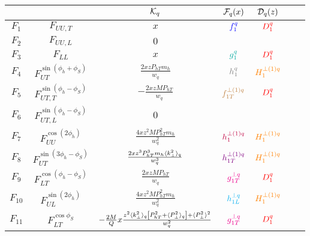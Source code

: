 \documentclass[floatfix,aps,prd,nofootinbib,superscriptaddress,preprint]{revtex4}
\newcommand\3[1]{\boldsymbol{#1}}
\newcommand{\Phperp}{P_{hT}}
\newcommand{\pperp}{P_\perp}
\newcommand{\avpperp}{\la \pperp^2 \ra}
\newcommand{\la}{\langle}
\newcommand{\ra}{\rangle}
\begin{document}
\begin{table}[h!]
\begin{tabular}{|c|c|c|c|c|c|c|}
\hline
         &                                     & ${\cal{K}}_q$                                                                               & ${\cal F}_q(x)$ & ${\cal D}_q(z)$ \\\hline
$F_1$    & $F_{UU,T}$                          & $x$                                                                                         & ${\color{blue} f_1^q}$          & ${\color{red} D_1^{q}} $          \\\hline
$F_2$    & $F_{UU,L}$                          & $0$                                                                                         &                 & \\\hline
$F_3$    & $F_{LL}$                            & $x$                                                                                         & $\ppdf$         & ${\color{red} D_1^{q}}$           \\\hline
$F_4$    & $F_{UT}^{\sin(\phi_h+\phi_S)}$      & $\frac{2 x z \Phperp  m_h}{w_q}$                                                            & $\transversity$ & ${\color{orange} H^{\perp(1)q}_{1} }$      \\\hline
$F_5$    & $F_{UT,T}^{\sin(\phi_h-\phi_S)}$    & $-\frac{2xzM \Phperp}{w_q}$                                                                 & ${\color{brown} f^{\perp(1)q}_{1T}}$       & ${\color{red} D_1^{q}}$           \\\hline
$F_6$    & $F_{UT,L}^{\sin(\phi_h-\phi_S)}$    & $0$                                                                                         &                 & \\\hline
$F_7$    & $F_{UU}^{\cos(2\phi_h)}$            & $\frac{4 x z^2 M \Phperp^2 m_h}{w_q^2} $                                                    & ${\color{purple} h^{\perp(1)q}_1 }$  & ${\color{orange} H^{\perp(1)q}_{1} } $     \\\hline
$F_8$    & $F_{UT}^{\sin(3\phi_h-\phi_S)}$     & $\frac{2 x z^3 \Phperp^3 m_h \avk}{w_q^3} $                                                 & ${\color{violet} h^{\perp(1)q}_{1T} }$ & ${\color{orange} H^{\perp(1)q}_{1} } $     \\\hline
$F_9$    & $F_{LT}^{\cos(\phi_h -\phi_S)}$     & $ \frac{2xzM\Phperp}{w_q} $                                                                 & ${\color{magenta} g^{\perp q}_{1T}}$          & ${\color{red} D_1^{q}}$           \\\hline
$F_{10}$ & $F_{UL}^{\sin(2\phi_h)}$            & $ \frac{4 xz^2M \Phperp^2 m_h}{w_q^2} $                                                     & ${\color{cyan}h^{\perp q}_{1L}}$          & ${\color{orange} H^{\perp(1)q}_{1} } $     \\\hline
$F_{11}$ & $F_{LT}^{\cos\phi_S}$               & $-\frac{2M}{Q} x\frac{z^2\avk \left[\Phperp^2+ \avp\right] + \avpperp^2}{ w_q^2}$           & ${\color{magenta} g^{\perp q}_{1T}}$          & ${\color{red} D_1^{q}}$           \\\hline

\end{tabular}
\end{table}
\end{document}
